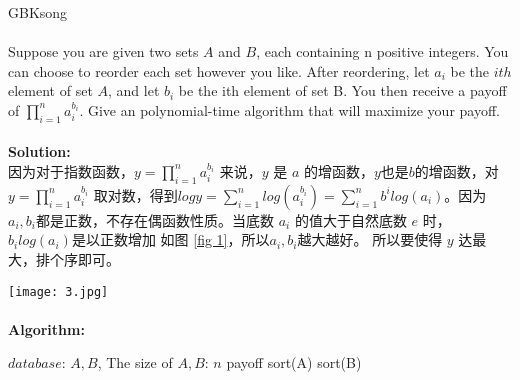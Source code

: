 \documentclass[11pt]{article}
\begin{document}
\begin{CJK*}{GBK}{song}

\paragraph{}Suppose you are given two sets $A$ and $B$, each containing n positive integers. You can choose to reorder each set however you like. After reordering, let $a_i$ be the $ith$ element of set $A$, and let $b_i$ be the ith element of set B. You then receive a payoff of $\prod^{n}_{i=1} a^{b_i}_i$. Give an polynomial-time algorithm that will maximize your payoff.

\paragraph{}\textbf{Solution:}\\
因为对于指数函数，$y = \prod^{n}_{i=1} a^{b_i}_i$ 来说，$y$ 是 $a$ 的增函数，$y$也是$b$的增函数，对$y = \prod^{n}_{i=1} a^{b_i}_i$ 取对数，得到$log y = \sum^{n}_{i=1} log(a^{b_i}_i) = \sum^{n}_{i=1} b^i log(a_i)$。因为$a_i, b_i$都是正数，不存在偶函数性质。当底数 $a_i$ 的值大于自然底数 $e$ 时， $b_i log(a_i)$是以正数增加 如图 \ref{fig 1}，所以$a_i, b_i$越大越好。 所以要使得 $y$ 达最大，排个序即可。

\begin{figure*}[!t]
\centering
\texttt{[image: 3.jpg]}
\caption{The function of $y = x$ and $y = logx$}
\label{fig 1}
\end{figure*}

    \paragraph{}\textbf{Algorithm:}\\
    \begin{algorithm}
        \caption{maximize your payoff}
        \begin{algorithmic}[1] %
            \Require $database$: $A, B$, \qquad The size of $A, B$: $n$
            \Ensure payoff
                \State sort(A)
                \State sort(B)


\end{algorithmic}
\end{algorithm}
\end{CJK*}
\end{document}
